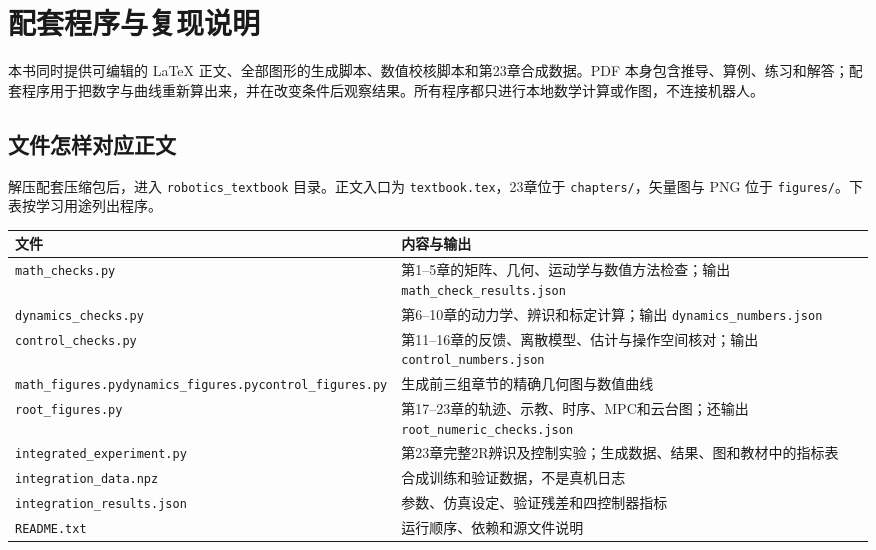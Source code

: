 \chapter{配套程序与复现说明}
\label{app:reproduce}

本书同时提供可编辑的 \LaTeX{} 正文、全部图形的生成脚本、数值校核脚本和第23章合成数据。PDF 本身包含推导、算例、练习和解答；配套程序用于把数字与曲线重新算出来，并在改变条件后观察结果。所有程序都只进行本地数学计算或作图，不连接机器人。

\section{文件怎样对应正文}

解压配套压缩包后，进入 \texttt{robotics\_textbook} 目录。正文入口为 \texttt{textbook.tex}，23章位于 \texttt{chapters/}，矢量图与 PNG 位于 \texttt{figures/}。下表按学习用途列出程序。

\begin{longtable}{>{\raggedright\arraybackslash}p{61mm}>{\raggedright\arraybackslash}p{90mm}}
\toprule 文件 & 内容与输出\\\midrule\endhead
\texttt{math\_checks.py} & 第1--5章的矩阵、几何、运动学与数值方法检查；输出 \texttt{math\_check\_results.json}\\
\texttt{dynamics\_checks.py} & 第6--10章的动力学、辨识和标定计算；输出 \texttt{dynamics\_numbers.json}\\
\texttt{control\_checks.py} & 第11--16章的反馈、离散模型、估计与操作空间核对；输出 \texttt{control\_numbers.json}\\
\texttt{math\_figures.py}\newline\texttt{dynamics\_figures.py}\newline\texttt{control\_figures.py} & 生成前三组章节的精确几何图与数值曲线\\
\texttt{root\_figures.py} & 第17--23章的轨迹、示教、时序、MPC和云台图；还输出 \texttt{root\_numeric\_checks.json}\\
\texttt{integrated\_experiment.py} & 第23章完整2R辨识及控制实验；生成数据、结果、图和教材中的指标表\\
\texttt{integration\_data.npz} & 合成训练和验证数据，不是真机日志\\
\texttt{integration\_results.json} & 参数、仿真设定、验证残差和四控制器指标\\
\texttt{README.txt} & 运行顺序、依赖和源文件说明\\
\bottomrule
\end{longtable}

